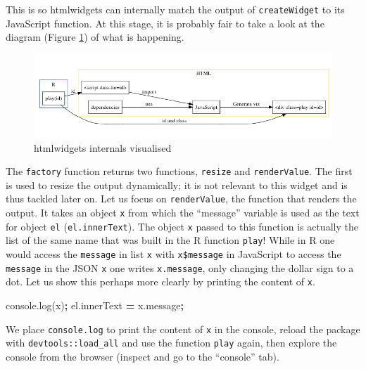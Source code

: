 \documentclass[10pt,]{krantz}
\makeatletter
\newenvironment{Shaded}{\begin{snugshade}}{\end{snugshade}}
\newcommand{\AttributeTok}[1]{\textcolor[rgb]{0.61,0.61,0.61}{#1}}
\newcommand{\NormalTok}[1]{#1}
\newcommand{\OperatorTok}[1]{\textcolor[rgb]{0.43,0.43,0.43}{\textbf{#1}}}
\newcommand{\VariableTok}[1]{\textcolor[rgb]{0,0,0}{#1}}
\newenvironment{kframe}{%
\medskip{}
\setlength{\fboxsep}{.8em}
 \def\at@end@of@kframe{}%
 \ifinner\ifhmode%
  \def\at@end@of@kframe{\end{minipage}}%
  \begin{minipage}{\columnwidth}%
 \fi\fi%
 \def\FrameCommand##1{\hskip\@totalleftmargin \hskip-\fboxsep
 \colorbox{shadecolor}{##1}\hskip-\fboxsep
     \hskip-\linewidth \hskip-\@totalleftmargin \hskip\columnwidth}%
 \MakeFramed {\advance\hsize-\width
   \@totalleftmargin\z@ \linewidth\hsize
   \@setminipage}}%
 {\par\unskip\endMakeFramed%
 \at@end@of@kframe}
\renewenvironment{Shaded}{\begin{kframe}}{\end{kframe}}
\makeatother
\begin{document}
This is so htmlwidgets can internally match the output of \texttt{createWidget} to its JavaScript function. At this stage, it is probably fair to take a look at the diagram (Figure \ref{fig:widget-internals-diagram}) of what is happening.

\begin{figure}[H]

{\centering \includegraphics[width=1\linewidth]{images/03-htmlwidgets-internals} 

}

\caption{htmlwidgets internals visualised}\label{fig:widget-internals-diagram}
\end{figure}

The \texttt{factory} function returns two functions, \texttt{resize} and \texttt{renderValue}. The first is used to resize the output dynamically; it is not relevant to this widget and is thus tackled later on. Let us focus on \texttt{renderValue}, the function that renders the output. It takes an object \texttt{x} from which the ``message'' variable is used as the text for object \texttt{el} (\texttt{el.innerText}). The object \texttt{x} passed to this function is actually the list of the same name that was built in the R function \texttt{play}! While in R one would access the \texttt{message} in list \texttt{x} with \texttt{x\$message} in JavaScript to access the \texttt{message} in the JSON \texttt{x} one writes \texttt{x.message}, only changing the dollar sign to a dot. Let us show this perhaps more clearly by printing the content of \texttt{x}.

\begin{Shaded}
\begin{Highlighting}[]
\VariableTok{console}\NormalTok{.}\AttributeTok{log}\NormalTok{(x)}\OperatorTok{;}
\VariableTok{el}\NormalTok{.}\AttributeTok{innerText} \OperatorTok{=} \VariableTok{x}\NormalTok{.}\AttributeTok{message}\OperatorTok{;}
\end{Highlighting}
\end{Shaded}

We place \texttt{console.log} to print the content of \texttt{x} in the console, reload the package with \texttt{devtools::load\_all} and use the function \texttt{play} again, then explore the console from the browser (inspect and go to the ``console'' tab).
\end{document}
